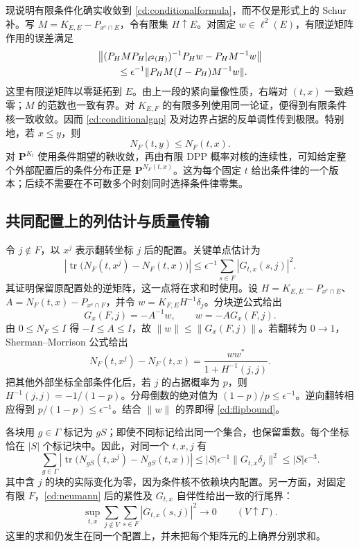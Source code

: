 \documentclass[UTF8,zihao=-4,a4paper]{ctexart}
\numberwithin{equation}{section}
\begin{document}
现说明有限条件化确实收敛到 \eqref{cd:conditionalformula}，而不仅是形式上的 Schur 补。写
$M=K_{E,E}-P_{x^c\cap E}$，令有限集 $H\uparrow E$。对固定 $w\in\ell^2(E)$，有限逆矩阵作用的误差满足
\begin{align}
&\bigl\|(P_HMP_H|_{\ell^2(H)})^{-1}P_Hw
                  -P_HM^{-1}w\bigr\|\notag\\
&\hspace{2em}\le\epsilon^{-1}
 \|P_HM(I-P_H)M^{-1}w\|.
\label{cd:compressioninverse}
\end{align}
这里有限逆矩阵以零延拓到 $E$。由上一段的紧向量像性质，右端对 $(t,x)$ 一致趋零；$M$ 的范数也一致有界。对 $K_{E,F}$ 的有限多列使用同一论证，便得到有限条件核一致收敛。因而 \eqref{cd:conditionalgap} 及对边界占据的反单调性传到极限。特别地，若 $x\le y$，则
\begin{equation}
N_F(t,y)\le N_F(t,x).
\label{cd:antitone}
\end{equation}
对 $\mathbf P^{K_t}$ 使用条件期望的鞅收敛，再由有限 DPP 概率对核的连续性，可知给定整个外部配置后的条件分布正是
$\mathbf P^{N_F(t,x)}$。这为每个固定 $t$ 给出条件律的一个版本；后续不需要在不可数多个时刻同时选择条件律零集。

\subsection{共同配置上的列估计与质量传输}\label{cd:sensitivity}

令 $j\notin F$，以 $x^j$ 表示翻转坐标 $j$ 后的配置。关键单点估计为
\begin{equation}
\left|\operatorname{tr}\bigl(N_F(t,x^j)-N_F(t,x)\bigr)\right|
\le\epsilon^{-1}\sum_{s\in F}|G_{t,x}(s,j)|^2.
\label{cd:flipbound}
\end{equation}
其证明保留原配置处的逆矩阵，这一点将在求和时使用。设
$H=K_{E,E}-P_{x^c\cap E}$、$A=N_F(t,x)-P_{x^c\cap F}$，并令
$w=K_{F,E}H^{-1}\delta_j$。分块逆公式给出
\[
G_x(F,j)=-A^{-1}w,\qquad w=-A G_x(F,j).
\]
由 $0\le N_F\le I$ 得 $-I\le A\le I$，故
$\|w\|\le\|G_x(F,j)\|$。若翻转为 $0\to1$，Sherman--Morrison 公式给出
\[
N_F(t,x^j)-N_F(t,x)=\frac{ww^*}{1+H^{-1}(j,j)}.
\]
把其他外部坐标全部条件化后，若 $j$ 的占据概率为 $p$，则
$H^{-1}(j,j)=-1/(1-p)$。分母倒数的绝对值为 $(1-p)/p\le\epsilon^{-1}$。逆向翻转相应得到 $p/(1-p)\le\epsilon^{-1}$。结合 $\|w\|$ 的界即得 \eqref{cd:flipbound}。

各块用 $g\in\Gamma$ 标记为 $gS$；即使不同标记给出同一个集合，也保留重数。每个坐标恰在 $|S|$ 个标记块中。因此，对同一个 $t,x,j$ 有
\begin{equation}
\sum_{g\in\Gamma}
 \left|\operatorname{tr}\bigl(N_{gS}(t,x^j)-N_{gS}(t,x)\bigr)\right|
\le |S|\epsilon^{-1}\|G_{t,x}\delta_j\|^2
\le |S|\epsilon^{-3}.
\label{cd:column}
\end{equation}
其中含 $j$ 的块的实际变化为零，因为条件核不依赖块内配置。另一方面，对固定有限 $F$，\eqref{cd:neumann} 后的紧性及 $G_{t,x}$ 自伴性给出一致的行尾界：
\begin{equation}
\sup_{t,x}\sum_{j\notin V}\sum_{s\in F}|G_{t,x}(s,j)|^2
\longrightarrow0\qquad(V\uparrow\Gamma).
\label{cd:rowtail}
\end{equation}
这里的求和仍发生在同一个配置上，并未把每个矩阵元的上确界分别求和。
\end{document}

